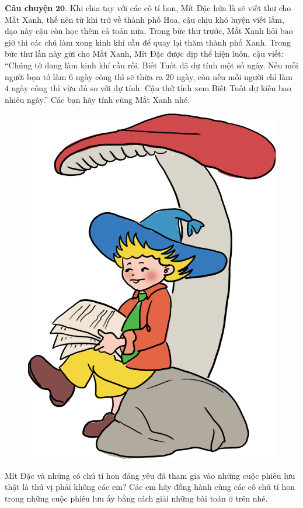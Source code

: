 	\textbf{\color{toancuabi}Câu chuyện} $\pmb{20.}$ Khi chia tay với các cô tí hon, Mít Đặc hứa là sẽ viết thư cho Mắt Xanh, thế nên từ khi trở về thành phố Hoa, cậu chịu khó luyện viết lắm, dạo này cậu còn học thêm cả toán nữa. Trong bức thư trước, Mắt Xanh hỏi bao giờ thì các chú làm xong kinh khí cầu để quay lại thăm thành phố Xanh. Trong bức thư lần này gửi cho Mắt Xanh, Mít Đặc được dịp thể hiện luôn, cậu viết: “Chúng tớ đang làm kinh khí cầu rồi. Biết Tuốt đã dự tính một số ngày. Nếu mỗi người bọn tớ làm $6$ ngày công thì sẽ thừa ra $20$ ngày, còn nếu mỗi người chỉ làm $4$ ngày công thì vừa đủ so với dự tính. Cậu thử tính xem Biết Tuốt dự kiến bao nhiêu ngày.” Các bạn hãy tính cùng Mắt Xanh nhé.
	\begin{figure}[H]
		\centering
		\vspace*{-5pt}
		\captionsetup{labelformat= empty, justification=centering}
		\includegraphics[width=0.35\linewidth]{Hinh22_MitDacLamToan}
		\vspace*{-10pt}
	\end{figure}
	Mít Đặc và những cô chú tí hon đáng yêu đã tham gia vào những cuộc phiêu lưu thật là thú vị phải không các em? Các em hãy đồng hành cùng các cô chú tí hon trong những cuộc phiêu lưu ấy bằng cách giải những bài toán ở trên nhé. 
